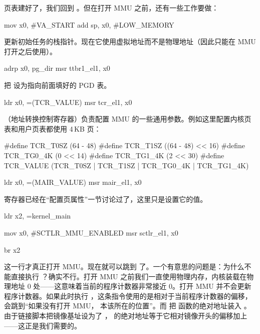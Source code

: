 页表建好了，我们回到 。但在打开 MMU 之前，还有一些工作要做：

\begin{asmcode}
	mov	x0, #VA_START
	add	sp, x0, #LOW_MEMORY
\end{asmcode}

更新初始任务的栈指针。现在它使用虚拟地址而不是物理地址（因此只能在 MMU 打开之后使用）。

\begin{asmcode}
	adrp	x0, pg_dir
	msr	ttbr1_el1, x0
\end{asmcode}

把  设为指向前面填好的 PGD 表。

\begin{asmcode}
	ldr	x0, =(TCR_VALUE)
	msr	tcr_el1, x0
\end{asmcode}

（地址转换控制寄存器）负责配置 MMU 的一些通用参数。例如这里配置内核页表和用户页表都使用 4\,KB 页：

\begin{ccode}
#define TCR_T0SZ			(64 - 48)
#define TCR_T1SZ			((64 - 48) << 16)
#define TCR_TG0_4K			(0 << 14)
#define TCR_TG1_4K			(2 << 30)
#define TCR_VALUE			(TCR_T0SZ | TCR_T1SZ | TCR_TG0_4K | TCR_TG1_4K)
\end{ccode}

\begin{asmcode}
	ldr	x0, =(MAIR_VALUE)
	msr	mair_el1, x0
\end{asmcode}

 寄存器已经在“配置页属性”一节讨论过了，这里只是设置它的值。

\begin{asmcode}
	ldr	x2, =kernel_main

	mov	x0, #SCTLR_MMU_ENABLED
	msr	sctlr_el1, x0

	br 	x2
\end{asmcode}

 这一行才真正打开 MMU。现在就可以跳到  了。一个有意思的问题是：为什么不能直接执行 ？确实不行。打开 MMU 之前我们一直使用物理内存，内核装载在物理地址 0 处——这意味着当前的程序计数器非常接近 0。打开 MMU 并不会更新程序计数器。如果此时执行 ，这条指令使用的是相对于当前程序计数器的偏移，会跳到“如果没有打开 MMU， 本该所在的位置”。而  把  函数的绝对地址装入 。由于链接脚本把镜像基址设为了 ， 的绝对地址等于它相对镜像开头的偏移加上 ——这正是我们需要的。

